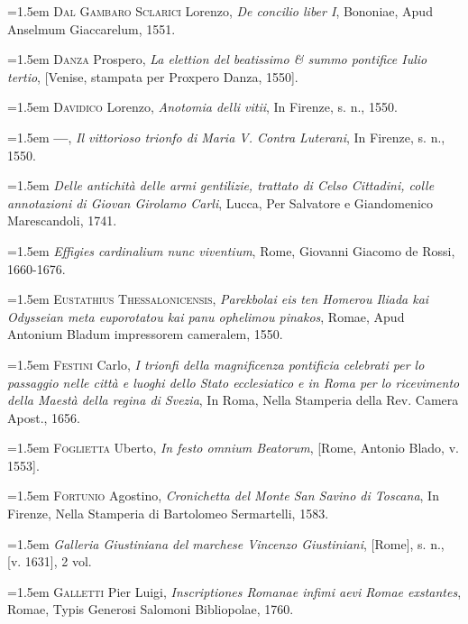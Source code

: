 \documentclass[12pt,twoside,openany]{book}
\newenvironment{PurhBibliography}
  {%
    \par
    \setlength{\parindent}{0pt}%
    \setlength{\leftskip}{0pt}%
  }
  {%
    \par
  }
\begin{document}
\begin{PurhBibliography}
\noindent\hangindent=1.5em \textsc{Dal Gambaro Sclarici} Lorenzo, \textit{De concilio liber I}, Bononiae, Apud Anselmum Giaccarelum, 1551.\par
\noindent\hangindent=1.5em \textsc{Danza} Prospero, \textit{La elettion del beatissimo \& summo pontifice Iulio tertio}, [Venise, stampata per Proxpero Danza, 1550].\par
\noindent\hangindent=1.5em \textsc{Davidico} Lorenzo, \textit{Anotomia delli vitii}, In Firenze, s. n., 1550.\par
\noindent\hangindent=1.5em \textbf{—}, \textit{Il vittorioso trionfo di Maria V. Contra Luterani}, In Firenze, s. n., 1550.\par
\noindent\hangindent=1.5em \textit{Delle antichità delle armi gentilizie, trattato di Celso Cittadini, colle annotazioni di Giovan Girolamo Carli}, Lucca, Per Salvatore e Giandomenico Marescandoli, 1741.\par
\noindent\hangindent=1.5em \textit{Effigies cardinalium nunc viventium}, Rome, Giovanni Giacomo de Rossi, 1660-1676.\par
\noindent\hangindent=1.5em \textsc{Eustathius Thessalonicensis}, \textit{Parekbolai eis ten Homerou Iliada kai Odysseian meta euporotatou kai panu ophelimou pinakos}, Romae, Apud Antonium Bladum impressorem cameralem, 1550.\par
\noindent\hangindent=1.5em \textsc{Festini} Carlo, \textit{I trionfi della magnificenza pontificia celebrati per lo passaggio nelle città e luoghi dello Stato ecclesiatico e in Roma per lo ricevimento della Maestà della regina di Svezia}, In Roma, Nella Stamperia della Rev. Camera Apost., 1656.\par
\noindent\hangindent=1.5em \textsc{Foglietta} Uberto, \textit{In festo omnium Beatorum}, [Rome, Antonio Blado, v. 1553].\par
\noindent\hangindent=1.5em \textsc{Fortunio} Agostino, \textit{Cronichetta del Monte San Savino di Toscana}, In Firenze, Nella Stamperia di Bartolomeo Sermartelli, 1583.\par
\noindent\hangindent=1.5em \textit{Galleria Giustiniana del marchese Vincenzo Giustiniani}, [Rome], s. n., [v. 1631], 2 vol.\par
\noindent\hangindent=1.5em \textsc{Galletti} Pier Luigi, \textit{Inscriptiones Romanae infimi aevi Romae exstantes}, Romae, Typis Generosi Salomoni Bibliopolae, 1760.\par

\end{PurhBibliography}
\end{document}
